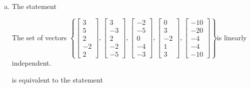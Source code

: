 \begin{exerciseAnswer}
\begin{enumerate}[(a)]
\item The statement 
\begin{center}\begin{minipage}{0.8\textwidth}
 The set of vectors \( \left\{ \left[\begin{array}{c}
3 \\
5 \\
2 \\
-2 \\
2
\end{array}\right] , \left[\begin{array}{c}
3 \\
-3 \\
2 \\
-2 \\
-5
\end{array}\right] , \left[\begin{array}{c}
-2 \\
-5 \\
0 \\
-4 \\
-3
\end{array}\right] , \left[\begin{array}{c}
0 \\
3 \\
-2 \\
1 \\
3
\end{array}\right] , \left[\begin{array}{c}
-10 \\
-20 \\
-4 \\
-4 \\
-10
\end{array}\right] \right\} \)is linearly independent.
\end{minipage}\end{center}
     is equivalent to the statement 
\begin{center}\begin{minipage}{0.8\textwidth}
 The vector equation \( x_{1} \left[\begin{array}{c}
3 \\
5 \\
2 \\
-2 \\
2
\end{array}\right] + x_{2} \left[\begin{array}{c}
3 \\
-3 \\

\end{array}
\end{minipage}
\end{center}
\end{enumerate}
\end{exerciseAnswer}
